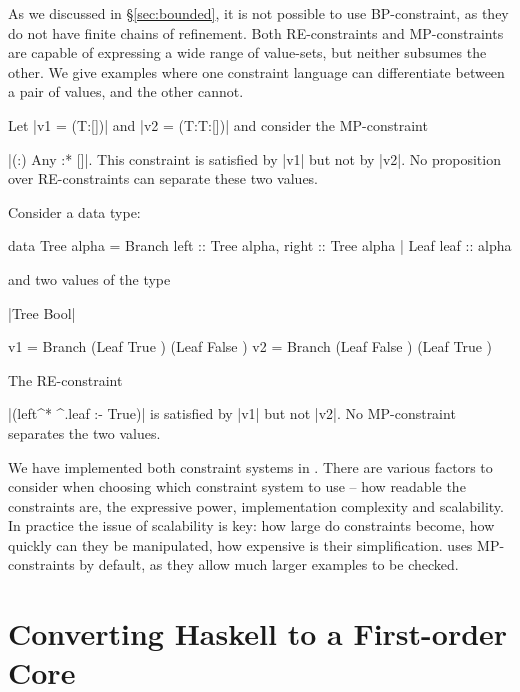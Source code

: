As we discussed in \S\ref{sec:bounded}, it is not possible to use BP-constraint, as they do not have finite chains of refinement. Both RE-constraints and MP-constraints are capable of expressing a wide range of value-sets, but neither subsumes the other. We give examples where one constraint language can differentiate between a pair of values, and the other cannot.

\begin{comment}
\begin{code}
data T = T
\end{code}
\end{comment}

\begin{example}
Let |v1 = (T:[])| and |v2 = (T:T:[])| and consider the MP-constraint \ignore|{(:) Any} :* {[]}|. This constraint is satisfied by |v1| but not by |v2|. No proposition over RE-constraints can separate these two values.
\end{example}

\begin{example}
Consider a data type:

\begin{code}
data Tree alpha  =  Branch  {left  :: Tree alpha, right :: Tree alpha}
                 |  Leaf    {leaf  :: alpha}
\end{code}

\noindent and two values of the type \ignore|Tree Bool|

\begin{code}
v1 = Branch (Leaf True   ) (Leaf False  )
v2 = Branch (Leaf False  ) (Leaf True   )
\end{code}

\noindent The RE-constraint \ignore|(left^* ^.leaf :- True)| is satisfied by |v1| but not |v2|. No MP-constraint separates the two values.
\end{example}

We have implemented both constraint systems in \catch{}. There are various factors to consider when choosing which constraint system to use -- how readable the constraints are, the expressive power, implementation complexity and scalability. In practice the issue of scalability is key: how large do constraints become, how quickly can they be manipulated, how expensive is their simplification. \newtool{} uses MP-constraints by default, as they allow much larger examples to be checked.

\section{Converting Haskell to a First-order Core}
\label{sec:transform}



